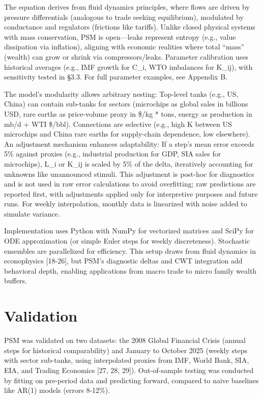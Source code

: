 \documentclass[11pt]{article}
\begin{document}
The equation derives from fluid dynamics principles, where flows are driven by pressure differentials (analogous to trade seeking equilibrium), modulated by conductance and regulators (frictions like tariffs). Unlike closed physical systems with mass conservation, PSM is open---leaks represent entropy (e.g., value dissipation via inflation), aligning with economic realities where total ``mass'' (wealth) can grow or shrink via compressors/leaks. Parameter calibration uses historical averages (e.g., IMF growth for C_i, WTO imbalances for K_ij), with sensitivity tested in §3.3. For full parameter examples, see Appendix B.

The model's modularity allows arbitrary nesting: Top-level tanks (e.g., US, China) can contain sub-tanks for sectors (microchips as global sales in billions USD, rare earths as price-volume proxy in \$/kg * tons, energy as production in mb/d + WTI \$/bbl). Connections are selective (e.g., high K between US microchips and China rare earths for supply-chain dependence, low elsewhere). An adjustment mechanism enhances adaptability: If a step's mean error exceeds 5\% against proxies (e.g., industrial production for GDP, SIA sales for microchips), L_i or K_ij is scaled by 5\% of the delta, iteratively accounting for unknowns like unannounced stimuli. This adjustment is post-hoc for diagnostics and is not used in raw error calculations to avoid overfitting; raw predictions are reported first, with adjustments applied only for interpretive purposes and future runs. For weekly interpolation, monthly data is linearized with noise added to simulate variance.

Implementation uses Python with NumPy for vectorized matrices and SciPy for ODE approximation (or simple Euler steps for weekly discreteness). Stochastic ensembles are parallelized for efficiency. This setup draws from fluid dynamics in econophysics [18-26], but PSM's diagnostic deltas and CWT integration add behavioral depth, enabling applications from macro trade to micro family wealth buffers.

\section{Validation}
PSM was validated on two datasets: the 2008 Global Financial Crisis (annual steps for historical comparability) and January to October 2025 (weekly steps with sector sub-tanks, using interpolated proxies from IMF, World Bank, SIA, EIA, and Trading Economics [27, 28, 29]). Out-of-sample testing was conducted by fitting on pre-period data and predicting forward, compared to naive baselines like AR(1) models (errors 8-12\%).
\end{document}
